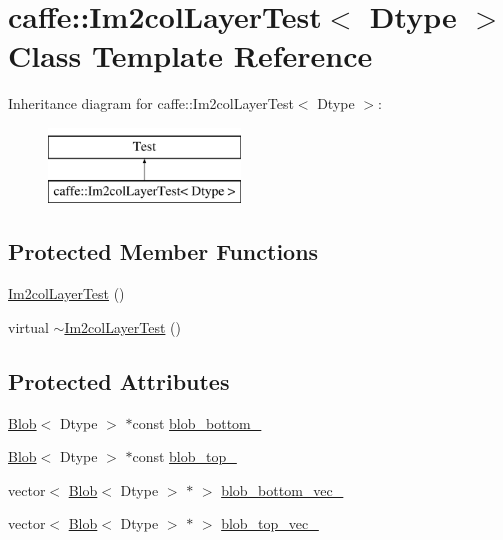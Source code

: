 \hypertarget{classcaffe_1_1_im2col_layer_test}{\section{caffe\+:\+:Im2col\+Layer\+Test$<$ Dtype $>$ Class Template Reference}
\label{classcaffe_1_1_im2col_layer_test}
}
Inheritance diagram for caffe\+:\+:Im2col\+Layer\+Test$<$ Dtype $>$\+:\begin{figure}[H]
\begin{center}
\leavevmode
\includegraphics[height=2.000000cm]{classcaffe_1_1_im2col_layer_test}
\end{center}
\end{figure}
\subsection*{Protected Member Functions}
\begin{DoxyCompactItemize}
\item 
\hyperlink{classcaffe_1_1_im2col_layer_test_a2651ce41b8c4202a776aabf0045b9979}{Im2col\+Layer\+Test} ()
\item 
virtual \hyperlink{classcaffe_1_1_im2col_layer_test_a2e3fa23c7c2cc695780e8bdd48c50f74}{$\sim$\+Im2col\+Layer\+Test} ()
\end{DoxyCompactItemize}
\subsection*{Protected Attributes}
\begin{DoxyCompactItemize}
\item 
\hyperlink{classcaffe_1_1_blob}{Blob}$<$ Dtype $>$ $\ast$const \hyperlink{classcaffe_1_1_im2col_layer_test_a8dcff9e3ad57f57c4e1ca6771be34554}{blob\+\_\+bottom\+\_\+}
\item 
\hyperlink{classcaffe_1_1_blob}{Blob}$<$ Dtype $>$ $\ast$const \hyperlink{classcaffe_1_1_im2col_layer_test_a04f605a94d9b6ead927c47c754b459b2}{blob\+\_\+top\+\_\+}
\item 
vector$<$ \hyperlink{classcaffe_1_1_blob}{Blob}$<$ Dtype $>$ $\ast$ $>$ \hyperlink{classcaffe_1_1_im2col_layer_test_ac9dfa820b4759b538a459cb5429943b1}{blob\+\_\+bottom\+\_\+vec\+\_\+}
\item 
vector$<$ \hyperlink{classcaffe_1_1_blob}{Blob}$<$ Dtype $>$ $\ast$ $>$ \hyperlink{classcaffe_1_1_im2col_layer_test_ac2f2ec2988cd9149e50dd366957d830e}{blob\+\_\+top\+\_\+vec\+\_\+}
\end{DoxyCompactItemize}


